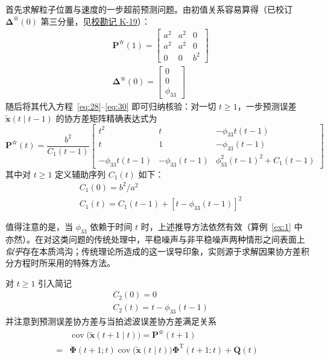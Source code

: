 \begin{example}
首先求解粒子位置与速度的一步超前预测问题。由初值关系容易算得（已校订 $\bm{\Delta}^{\text{✫}}(0)$ 第三分量，见\hyperref[sec:k19]{校勘记 K-19}）：
\begin{equation*}
\begin{aligned}
&\bm{P}^{\text{✫}}(1) = \begin{bmatrix} a^2 & a^2 & 0 \\ a^2 & a^2 & 0 \\ 0 & 0 & b^2 \end{bmatrix} \\
&\bm{\Delta}^{\text{✫}}(0) = \begin{bmatrix} 0 \\ 0 \\ \phi_{33} \end{bmatrix}
\end{aligned}
\end{equation*}
随后将其代入方程~\eqref{eq:28}–\eqref{eq:30} 即可归纳核验：对一切 $t \geq 1$，一步预测误差 $\tilde{\bm{x}}(t \mid t - 1)$ 的协方差矩阵精确表达式为
\begin{equation*}
\bm{P}^{\text{✫}}(t) = \frac{b^2}{C_1(t - 1)} \begin{bmatrix} t^2 & t & -\phi_{33}t(t - 1) \\ t & 1 & -\phi_{33}(t - 1) \\ -\phi_{33}t(t - 1) & -\phi_{33}(t - 1) & \phi_{33}^2(t - 1)^2 + C_1(t - 1) \end{bmatrix}
\end{equation*}
其中对 $t \geq 1$ 定义辅助序列 $C_1(t)$ 如下：
\begin{equation*}
\begin{aligned}
&C_1(0) = b^2 / a^2 \\
&C_1(t) = C_1(t - 1) + [t - \phi_{33}(t - 1)]^2
\end{aligned}
\end{equation*}

值得注意的是，当 $\phi_{33}$ 依赖于时间 $t$ 时，上述推导方法依然有效（算例~\ref{ex:1} 中亦然）。在对这类问题的传统处理中，平稳噪声与非平稳噪声两种情形之间表面上\emph{似乎}存在本质鸿沟；传统理论所造成的这一误导印象，实则源于求解因果协方差积分方程时所采用的特殊方法。

对 $t \geq 1$ 引入简记
\begin{equation*}
\begin{aligned}
&C_2(0) = 0 \\
&C_2(t) = t - \phi_{33}(t - 1)
\end{aligned}
\end{equation*}
并注意到预测误差协方差与当拍滤波误差协方差满足关系
\begin{equation*}
\begin{aligned}
&\operatorname{cov}\bigl(\tilde{\bm{x}}(t + 1 \mid t)\bigr) = \bm{P}^{\text{✫}}(t + 1) \\
= &\bm{\Phi}(t + 1; t)\operatorname{cov}\bigl(\tilde{\bm{x}}(t \mid t)\bigr)\bm{\Phi}^{\mathrm{T}}(t + 1; t) + \bm{Q}(t)
\end{aligned}
\end{equation*}


\end{example}
